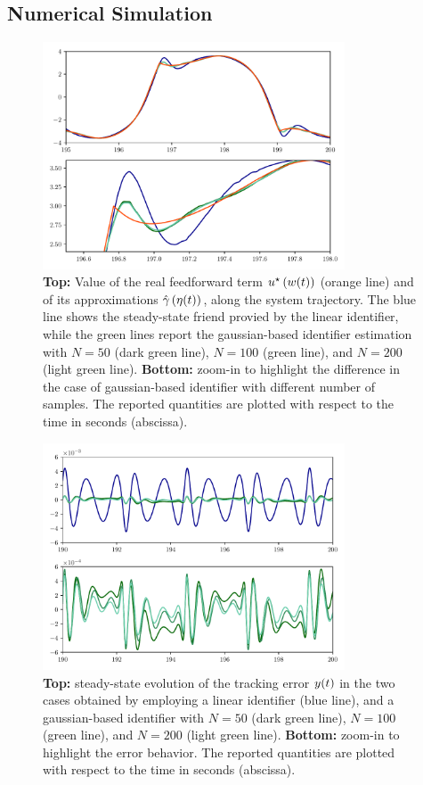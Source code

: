 \subsection{Numerical Simulation}%
\label{SEC:PREP-NUMERICAL-SIMULATION}
\begin{figure}[!t]
	\centering
	\includegraphics[width=0.8\textwidth]{Figs/Chapter8-9/preprocessing_ctrl_action.pdf}
	\caption{\textbf{Top:} Value of the real feedforward term $u^{\star}\left( w(t) \right)$ (orange line) and of its approximations $\hat{\gamma} \left( \eta(t) \right)$,
	along the system trajectory. The blue line shows the steady-state friend provied by the linear identifier,
	while the green lines report the gaussian-based identifier estimation with $N = 50$ (dark green line),
	$N = 100$ (green line), and $N = 200$ (light green line).
	\textbf{Bottom:} zoom-in to highlight the difference in the case of gaussian-based identifier with different number of samples.
	The reported quantities are plotted with respect to the time in seconds (abscissa).}
	\label{FIG:OR-PREPROCESSING-CTRL}
\end{figure}
\begin{figure}[!t]
	\centering
	\includegraphics[width=0.8\textwidth]{Figs/Chapter8-9/preprocessing_errors.pdf}
	\caption{\textbf{Top:} steady-state evolution of the tracking error $y(t)$ in the two cases obtained by employing a linear identifier (blue line),
	and a gaussian-based identifier with $N = 50$ (dark green line), $N = 100$ (green line), and $N = 200$ (light green line).
	\textbf{Bottom:} zoom-in to highlight the error behavior.
	The reported quantities are plotted with respect to the time in seconds (abscissa).}
	\label{FIG:OR-PREPROCESSING-ERRORS}
\end{figure}

